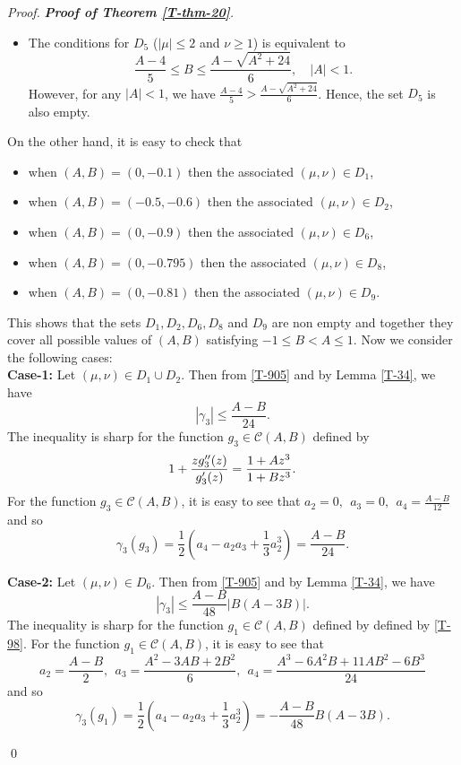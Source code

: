 \documentclass[a4paper,12pt]{amsart}
\theoremstyle{definition}
\newenvironment{pf}[1][]{%
 \vskip 3mm
 \noindent
 \ifthenelse{\equal{#1}{}}%
  {{\slshape Proof. }}%
  {{\slshape #1.} }%
 }%
{\qed\bigskip}
\begin{document}
\begin{pf}[\textbf{Proof of Theorem \ref{T-thm-20}}]
\begin{itemize}
\item The conditions for $D_5$ ($|\mu| \le 2$ and $\nu \ge 1$) is equivalent to 
\[
\frac{A-4}{5} \leq B \leq \frac{A - \sqrt{A^2 + 24}}{6}, \quad |A| < 1.
\]
However, for any \(|A| < 1\), we have \(\frac{A-4}{5} > \frac{A - \sqrt{A^2 + 24}}{6}\). Hence, the set \(D_5\) is also empty.

\end{itemize}

On the other hand, it is easy to check that 
\begin{itemize}
\item when \((A,B)=(0,-0.1)\) then the associated $(\mu,\nu)\in D_1$,
\item when \((A,B)=(-0.5,-0.6)\) then the associated $(\mu,\nu)\in D_2$,
\item when \((A,B)=(0,-0.9)\) then the associated $(\mu,\nu)\in D_6$,
\item when \((A,B)=(0,-0.795)\) then the associated $(\mu,\nu)\in D_8$,
\item when \((A,B)=(0,-0.81)\) then the associated $(\mu,\nu)\in D_9$.
\end{itemize}
This shows that the sets $D_1, D_2, D_6, D_8$ and $D_9$ are non empty and together they cover all possible values of $(A,B)$ satisfying \(-1 \leq B < A \leq 1\).
Now we consider the following cases:\\


\textbf{Case-1:}  Let $(\mu,\nu)\in D_1\cup D_2$. Then from \eqref{T-905} and by Lemma \ref{T-34}, we have
$$
|\gamma_{3}|\le\frac{A-B}{24}.
$$
The inequality is sharp for the function $g_3\in\mathcal{C}(A,B)$ defined by
$$
1 + \frac{zg_3''(z)}{g_3'(z)} = \frac{1+Az^3}{1+Bz^3}.\\
$$
For the function $g_3\in\mathcal{C}(A,B)$, it is easy to see that $a_2=0,~~ a_3=0,~~ a_4=\frac{A-B}{12}$ and so
$$
\gamma_3(g_3)=\frac{1}{2}\left(a_4-a_2a_3+\frac{1}{3}a_2^3\right)=\frac{A-B}{24}.
$$



\textbf{Case-2:} Let $(\mu,\nu)\in D_6$. Then from \eqref{T-905} and by Lemma \ref{T-34}, we have
$$
|\gamma_{3}|\le\frac{A-B}{48}|B(A-3B)|.
$$
The inequality is sharp for the function $g_1\in\mathcal{C}(A,B)$ defined by defined by \eqref{T-98}. For the function $g_1\in\mathcal{C}(A,B)$, it is easy to see that
$$
a_2=\frac{A-B}{2},~~ a_3=\frac{A^2-3AB+2B^2}{6}, ~~a_4=\frac{A^3-6A^2B+11AB^2-6B^3}{24}
$$
and so 
$$\gamma_3(g_1)=\frac{1}{2}\left(a_4-a_2a_3+\frac{1}{3}a_2^3\right)=-\frac{A-B}{48}B(A-3B).$$




\end{pf}
\end{document}
